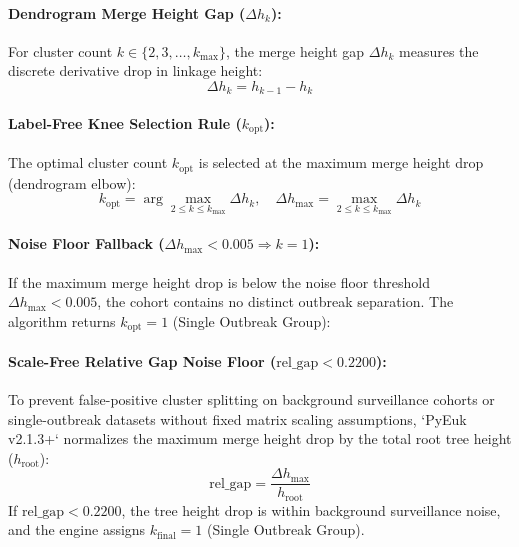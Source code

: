 \documentclass[11pt,a4paper]{article}
\begin{document}
\paragraph{Dendrogram Merge Height Gap ($\Delta h_k$):} For cluster count $k \in \{2, 3, \dots, k_{\text{max}}\}$, the merge height gap $\Delta h_k$ measures the discrete derivative drop in linkage height:
\begin{equation}
\Delta h_k = h_{k-1} - h_k
\end{equation}

\paragraph{Label-Free Knee Selection Rule ($k_{\text{opt}}$):}
The optimal cluster count $k_{\text{opt}}$ is selected at the maximum merge height drop (dendrogram elbow):
\begin{equation}
k_{\text{opt}} = \arg\max_{2 \le k \le k_{\text{max}}} \Delta h_k, \quad \Delta h_{\text{max}} = \max_{2 \le k \le k_{\text{max}}} \Delta h_k
\end{equation}

\paragraph{Noise Floor Fallback ($\Delta h_{\text{max}} < 0.005 \Rightarrow k=1$):}
If the maximum merge height drop is below the noise floor threshold $\Delta h_{\text{max}} < 0.005$, the cohort contains no distinct outbreak separation. The algorithm returns $k_{\text{opt}} = 1$ (Single Outbreak Group):
\paragraph{Scale-Free Relative Gap Noise Floor ($\text{rel\_gap} < 0.2200$):}
To prevent false-positive cluster splitting on background surveillance cohorts or single-outbreak datasets without fixed matrix scaling assumptions, `PyEuk v2.1.3+` normalizes the maximum merge height drop by the total root tree height ($h_{\text{root}}$):
\begin{equation}
\text{rel\_gap} = \frac{\Delta h_{\text{max}}}{h_{\text{root}}}
\end{equation}
If $\text{rel\_gap} < 0.2200$, the tree height drop is within background surveillance noise, and the engine assigns $k_{\text{final}} = 1$ (Single Outbreak Group).
\end{document}
